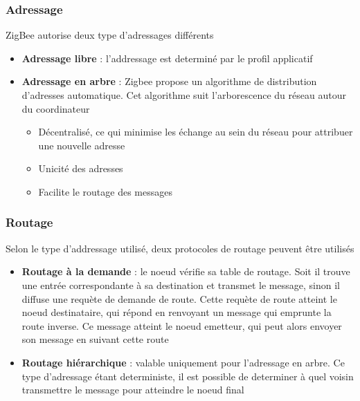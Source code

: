 \documentclass{beamer}
\begin{document}
  \begin{frame}
    \frametitle{Adressage}
    \begin{block}{ZigBee autorise deux type d'adressages différents}
      \begin{itemize}
	\item \textbf{Adressage libre} : l'addressage est determiné par le profil applicatif
	 \item \textbf{Adressage en arbre} : Zigbee propose un algorithme de distribution d'adresses automatique. Cet algorithme suit l'arborescence du réseau autour du coordinateur
	 \begin{itemize}
	  \item Décentralisé, ce qui minimise les échange au sein du réseau pour attribuer une nouvelle adresse
	  \item Unicité des adresses
	  \item Facilite le routage des messages
	 \end{itemize}

      \end{itemize}     
    \end{block}
  \end{frame}
  
  \begin{frame}
    \frametitle{Routage}
    \begin{block}{Selon le type d'addressage utilisé, deux protocoles de routage peuvent être utilisés}
      \begin{itemize}
        \item \textbf{Routage à la demande} : le noeud vérifie sa table de routage. Soit il trouve une entrée correspondante à sa destination et transmet le message, sinon il diffuse une requète de demande de route. Cette requète de route atteint le noeud destinataire, qui répond en renvoyant un message qui emprunte la route inverse. Ce message atteint le noeud emetteur, qui peut alors envoyer son message en suivant cette route
        \item \textbf{Routage hiérarchique} : valable uniquement pour l'adressage en arbre. Ce type d'adressage étant deterministe, il est possible de determiner à quel voisin transmettre le message pour atteindre le noeud final
      \end{itemize}
    \end{block}
  \end{frame}
  
\end{document}
